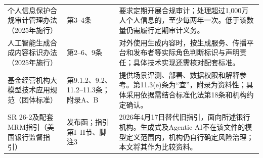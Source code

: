 {\begin{longtable}{@{}P{43mm}P{32mm}P{77mm}@{}}
个人信息保护合规审计管理办法\newline（2025年施行） & 第3--4条 & 要求定期开展合规审计；处理超过1,000万人个人信息的，至少每两年一次。低于该数量仍需履行定期审计义务。\\
人工智能生成合成内容标识办法\newline（2025年施行） & 第2--6、9条 & 对外使用生成内容时，按生成服务、传播平台和发布者等实际角色判断标识与声明责任；具体技术实现还需核对配套标准。\\
基金经营机构大模型技术应用规范\newline（团体标准） & 第9.1.2、9.2、11.2--11.3条；附录A、B & 提供场景评测、部署、数据权限和解释参考。第11.3(e)条为“宜”，附录为资料性；具体采用依据需结合标准化法第18条和机构约定确认。\\
SR 26-2及配套MRM指引\newline（美国银行监督指引） & 发布函；指引第I--II节、脚注3 & 2026年4月17日替代旧指引，面向所述银行机构。生成式及Agentic AI不在该文件的模型定义范围内，机构仍自行确定风险治理；本文将其作为比较资料。\\
\end{longtable}}
